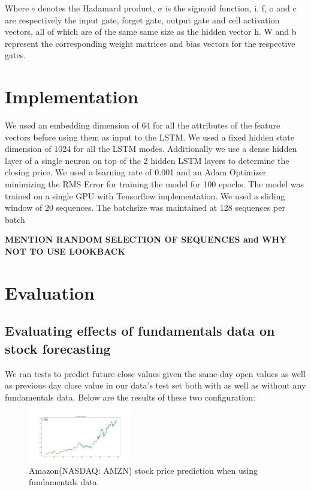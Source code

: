 \documentclass{article}
\begin{document}
Where $\circ$ denotes the Hadamard product, $\sigma$ is the sigmoid function, i, f, o and c are respectively the input gate, forget gate, output gate and cell activation vectors, all of which are of the same same size as the hidden vector h. W and b represent the corresponding weight matrices and bias vectors for the respective gates.

\section{Implementation}
\label{sec:implementation}

We used an embedding dimension of 64 for all the attributes of the feature vectors before using them as input to the LSTM. We used a fixed hidden state dimension of 1024 for all the LSTM modes. Additionally we use a dense hidden layer of a single neuron on top of the 2 hidden LSTM layers to determine the closing price. We used a learning rate of 0.001 and an Adam Optimizer minimizing the RMS Error for training the model for 100 epochs. The model was trained on a single GPU with Tensorflow implementation. We used a sliding window of 20 sequences. The batchsize was maintained at 128 sequences per batch

\textbf{MENTION RANDOM SELECTION OF SEQUENCES and WHY NOT TO USE LOOKBACK}

\section{Evaluation}
\label{sec:implementation}

\subsection{Evaluating effects of fundamentals data on stock forecasting}
\label{ssec:lstm_fundamentals_data}

We ran tests to predict future close values given the same-day open values as well as previous day close value in our data’s test set both with as well as without any fundamentals data. Below are the results of these two configuration:

\begin{figure}[h]
\centering
\includegraphics[width=0.4\textwidth]{amazon_incl_fundamentals}
\caption{Amazon(NASDAQ: AMZN) stock price prediction when using fundamentals data}
\label{fig:amazon_with_funda}
\end{figure}
\end{document}
